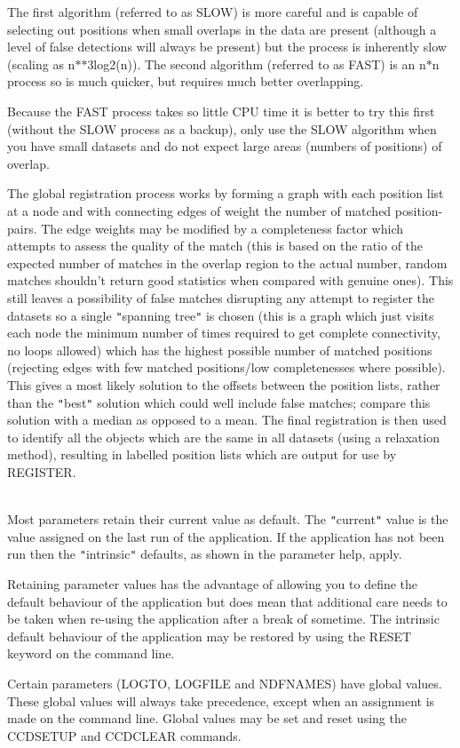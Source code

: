 \documentclass[twoside,11pt]{article}
\newcommand{\htmlref}[2]{#1}
\renewcommand{\_}{\texttt{\symbol{95}}}
\newcommand{\qt}[1]{{\tt "}#1{\tt "}}
\newcommand{\xroutine}[1]{\htmlref{{\sc #1}}{#1}}
\newcommand{\sstdiytopic}[2]{\item[#1:] \mbox{} \\[1.3ex] #2}
\newcommand{\sstdiytopic}[2]{\item[{#1}] #2 }
\begin{document}
{{      The first algorithm (referred to as SLOW) is more careful and is
      capable of selecting out positions when small overlaps in the
      data are present (although a level of false detections will
      always be present) but the process is inherently slow (scaling as
      n$*$$*$3log2(n)).  The second algorithm (referred to as FAST) is an
      n$*$n process so is much quicker, but requires much better
      overlapping.

      Because the FAST process takes so little CPU time it is better to
      try this first (without the SLOW process as a backup), only use
      the SLOW algorithm when you have small datasets and do not
      expect large areas (numbers of positions) of overlap.

      The global registration process works by forming a graph with
      each position list at a node and with connecting edges of weight
      the number of matched position-pairs. The edge weights may be
      modified by a completeness factor which attempts to assess the
      quality of the match (this is based on the ratio of the expected
      number of matches in the overlap region to the actual number,
      random matches shouldn't return good statistics when compared
      with genuine ones). This still leaves a possibility of false
      matches disrupting any attempt to register the datasets so a
      single \qt{spanning tree} is chosen (this is a graph which just
      visits each node the minimum number of times required to get
      complete connectivity, no loops allowed) which has the highest
      possible number of matched positions (rejecting edges with few
      matched positions/low completenesses where possible). This gives
      a most likely solution to the offsets between the position lists,
      rather than the \qt{best} solution which could well include false
      matches; compare this solution with a median as opposed to a
      mean. The final registration is then used to identify all the
      objects which are the same in all datasets (using a relaxation
      method), resulting in labelled position lists which are output
      for use by \xroutine{REGISTER}.
   }
   \sstdiytopic{
      Behaviour of parameters
   } {
      Most parameters retain their current value as default. The
      \qt{current} value is the value assigned on the last run of the
      application. If the application has not been run then the
      \qt{intrinsic} defaults, as shown in the parameter help, apply.

      Retaining parameter values has the advantage of allowing you to
      define the default behaviour of the application but does mean
      that additional care needs to be taken when re-using the
      application after a break of sometime. The intrinsic default
      behaviour of the application may be restored by using the RESET
      keyword on the command line.

      Certain parameters (LOGTO, LOGFILE and NDFNAMES) have global
      values. These global values will always take precedence, except
      when an assignment is made on the command line.  Global values may
      be set and reset using the \xroutine{CCDSETUP} and \xroutine{CCDCLEAR} commands.
   }
}
\end{document}
